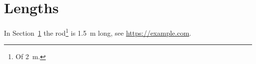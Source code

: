 \documentclass{article}
\begin{document}
\section{Lengths}\label{s:len}
In Section~\ref{s:len} the rod\footnote{Of \SI{2}{\metre}.} is \qty{1.5}{\metre} long, see \url{https://example.com}.
\end{document}
